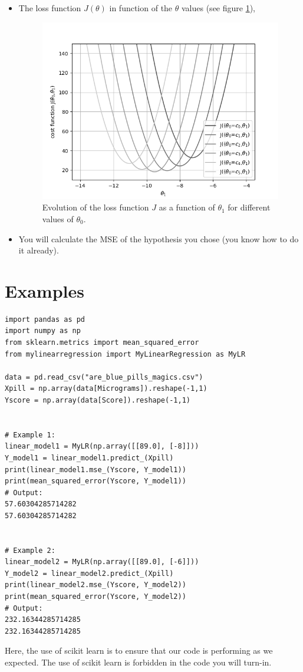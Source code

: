 \documentclass{42-en}
\begin{document}
\begin{itemize}
  \item The loss function $J(\theta)$ in function of the $\theta$ values (see figure \ref{loss function qs function of theta1 and theta0}),
  \begin{figure}[!h]
    \centering
    \includegraphics[scale=0.6]{assets/ex04_J_vs_t1.png}
    \caption{Evolution of the loss function $J$ as a function of $\theta_1$ for different values of $\theta_0$.}
    \label{loss function qs function of theta1 and theta0}
  \end{figure}
   
  \item You will calculate the MSE of the hypothesis you chose (you know how to do it already).
\end{itemize}

\section*{Examples}
\begin{verbatim}
import pandas as pd
import numpy as np
from sklearn.metrics import mean_squared_error
from mylinearregression import MyLinearRegression as MyLR

data = pd.read_csv("are_blue_pills_magics.csv")
Xpill = np.array(data[Micrograms]).reshape(-1,1)
Yscore = np.array(data[Score]).reshape(-1,1)


# Example 1:
linear_model1 = MyLR(np.array([[89.0], [-8]]))
Y_model1 = linear_model1.predict_(Xpill)
print(linear_model1.mse_(Yscore, Y_model1))
print(mean_squared_error(Yscore, Y_model1))
# Output:
57.60304285714282
57.60304285714282


# Example 2:
linear_model2 = MyLR(np.array([[89.0], [-6]]))
Y_model2 = linear_model2.predict_(Xpill)
print(linear_model2.mse_(Yscore, Y_model2))
print(mean_squared_error(Yscore, Y_model2))
# Output:
232.16344285714285
232.16344285714285
\end{verbatim}
\par
Here, the use of scikit learn is to ensure that our code is performing as we expected. The use of scikit learn is forbidden in the code you will turn-in.
\end{document}
